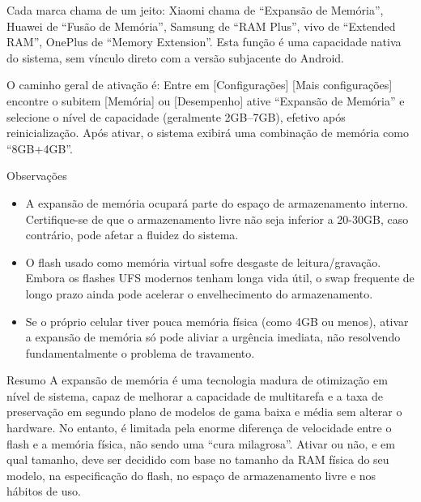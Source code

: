 
Cada marca chama de um jeito: Xiaomi chama de “Expansão de Memória”, Huawei de “Fusão de Memória”, Samsung de “RAM Plus”, vivo de “Extended RAM”, OnePlus de “Memory Extension”. Esta função é uma capacidade nativa do sistema, sem vínculo direto com a versão subjacente do Android.

O caminho geral de ativação é: Entre em [Configurações] [Mais configurações] encontre o subitem [Memória] ou [Desempenho] ative “Expansão de Memória” e selecione o nível de capacidade (geralmente 2GB–7GB), efetivo após reinicialização. Após ativar, o sistema exibirá uma combinação de memória como “8GB+4GB”.

\begin{tcbwarn}{Observações}
\begin{itemize}
  \item A expansão de memória ocupará parte do espaço de armazenamento interno. Certifique-se de que o armazenamento livre não seja inferior a 20-30GB, caso contrário, pode afetar a fluidez do sistema.
  \item O flash usado como memória virtual sofre desgaste de leitura/gravação. Embora os flashes UFS modernos tenham longa vida útil, o swap frequente de longo prazo ainda pode acelerar o envelhecimento do armazenamento.
  \item Se o próprio celular tiver pouca memória física (como 4GB ou menos), ativar a expansão de memória só pode aliviar a urgência imediata, não resolvendo fundamentalmente o problema de travamento.
\end{itemize}

\end{tcbwarn}

\begin{tcbinfo}{Resumo}
A expansão de memória é uma tecnologia madura de otimização em nível de sistema, capaz de melhorar a capacidade de multitarefa e a taxa de preservação em segundo plano de modelos de gama baixa e média sem alterar o hardware. No entanto, é limitada pela enorme diferença de velocidade entre o flash e a memória física, não sendo uma “cura milagrosa”. Ativar ou não, e em qual tamanho, deve ser decidido com base no tamanho da RAM física do seu modelo, na especificação do flash, no espaço de armazenamento livre e nos hábitos de uso.

\end{tcbinfo}

